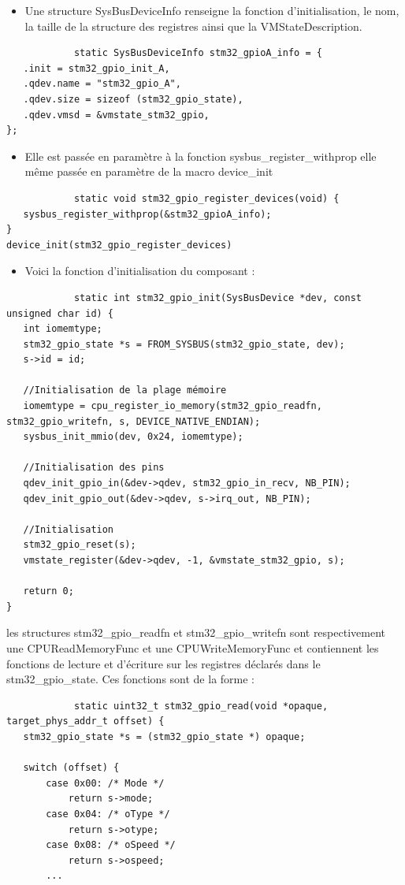 \documentclass{article}
\begin{document}
			\begin{itemize}
				\item Une structure SysBusDeviceInfo renseigne la fonction d'initialisation, 
				le nom, la taille de la structure des registres ainsi que la VMStateDescription. 
			\end{itemize}
			\begin{verbatim}
			static SysBusDeviceInfo stm32_gpioA_info = {
   .init = stm32_gpio_init_A,
   .qdev.name = "stm32_gpio_A",
   .qdev.size = sizeof (stm32_gpio_state),
   .qdev.vmsd = &vmstate_stm32_gpio,
};
			\end{verbatim}
			\begin{itemize}
				\item     Elle est passée en paramètre à la fonction sysbus\_register\_withprop elle 
				même passée en paramètre de la macro device\_init 
			\end{itemize}
			\begin{verbatim}
			static void stm32_gpio_register_devices(void) {
   sysbus_register_withprop(&stm32_gpioA_info);
}
device_init(stm32_gpio_register_devices)
			\end{verbatim}
			\begin{itemize}
				\item Voici la fonction d'initialisation du composant : 
			\end{itemize}
			\begin{verbatim}
			static int stm32_gpio_init(SysBusDevice *dev, const unsigned char id) {
   int iomemtype;
   stm32_gpio_state *s = FROM_SYSBUS(stm32_gpio_state, dev);
   s->id = id;
   
   //Initialisation de la plage mémoire
   iomemtype = cpu_register_io_memory(stm32_gpio_readfn, stm32_gpio_writefn, s, DEVICE_NATIVE_ENDIAN);
   sysbus_init_mmio(dev, 0x24, iomemtype);

   //Initialisation des pins
   qdev_init_gpio_in(&dev->qdev, stm32_gpio_in_recv, NB_PIN);
   qdev_init_gpio_out(&dev->qdev, s->irq_out, NB_PIN);

   //Initialisation
   stm32_gpio_reset(s);
   vmstate_register(&dev->qdev, -1, &vmstate_stm32_gpio, s);

   return 0;
}
			\end{verbatim}
			les structures stm32\_gpio\_readfn et stm32\_gpio\_writefn sont respectivement une 
			CPUReadMemoryFunc et une CPUWriteMemoryFunc et contiennent les fonctions de lecture
			et d'écriture sur les registres déclarés dans le stm32\_gpio\_state. Ces fonctions sont de la forme : 
			\begin{verbatim}
			static uint32_t stm32_gpio_read(void *opaque, target_phys_addr_t offset) {
   stm32_gpio_state *s = (stm32_gpio_state *) opaque;

   switch (offset) {
       case 0x00: /* Mode */
           return s->mode;
       case 0x04: /* oType */
           return s->otype;
       case 0x08: /* oSpeed */
           return s->ospeed;
       ...
			\end{verbatim}
\end{document}

